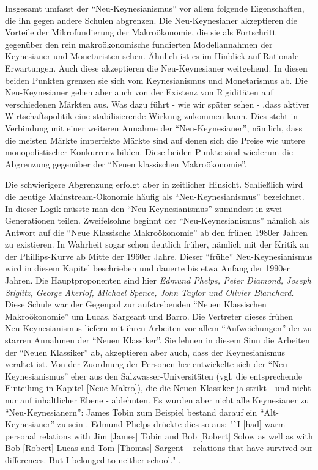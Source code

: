 Insgesamt umfasst der "`Neu-Keynesianismus"' vor allem folgende Eigenschaften, die ihn gegen andere Schulen abgrenzen. Die Neu-Keynesianer akzeptieren die Vorteile der Mikrofundierung der Makroökonomie, die sie als Fortschritt gegenüber den rein makroökonomische fundierten Modellannahmen der Keynesianer und Monetaristen sehen. Ähnlich ist es im Hinblick auf Rationale Erwartungen. Auch diese akzeptieren die Neu-Keynesianer weitgehend. In diesen beiden Punkten grenzen sie sich vom Keynesianismus und Monetarismus ab. Die Neu-Keynesianer gehen aber auch von der Existenz von Rigiditäten auf verschiedenen Märkten aus. Was dazu führt - wie wir später sehen - ,dass aktiver Wirtschaftspolitik eine stabilisierende Wirkung zukommen kann. Dies steht in Verbindung mit einer weiteren Annahme der "`Neu-Keynesianer"', nämlich, dass die meisten Märkte imperfekte Märkte sind auf denen sich die Preise wie untere monopolistischer Konkurrenz bilden. Diese beiden Punkte sind wiederum die Abgrenzung gegenüber der "`Neuen klassischen Makroökonomie"'. 

Die schwierigere Abgrenzung erfolgt aber in zeitlicher Hinsicht. Schließlich wird die heutige Mainstream-Ökonomie häufig als "`Neu-Keynesianismus"' bezeichnet. In dieser Logik müsste man den "`Neu-Keynesianismus"' zumindest in zwei Generationen teilen. Zweifelsohne beginnt der "`Neu-Keynesianismus"' nämlich als Antwort auf die "`Neue Klassische Makroökonomie"' ab den frühen 1980er Jahren zu existieren. In Wahrheit sogar schon deutlich früher, nämlich mit der Kritik an der Phillips-Kurve ab Mitte der 1960er Jahre. Dieser "`frühe"' Neu-Keynesianismus wird in diesem Kapitel beschrieben und dauerte bis etwa Anfang der 1990er Jahren. Die Hauptproponenten sind hier \textit{Edmund Phelps, Peter Diamond, Joseph Stiglitz, George Akerlof, Michael Spence, John Taylor und Olivier Blanchard}. Diese Schule war der Gegenpol zur aufstrebenden "`Neuen Klassischen Makroökonomie"' um Lucas, Sargeant und Barro. Die Vertreter dieses frühen Neu-Keynesianismus liefern mit ihren Arbeiten vor allem "`Aufweichungen"' der zu starren Annahmen der "`Neuen Klassiker"'. Sie lehnen in diesem Sinn die Arbeiten der "`Neuen Klassiker"' ab, akzeptieren aber auch, dass der Keynesianismus veraltet ist. Von der Zuordnung der Personen her entwickelte sich der "`Neu-Keynesianismus"' eher aus den Salzwasser-Universitäten (vgl. die entsprechende Einteilung in Kapitel \ref{Neue Makro}), die die Neuen Klassiker ja strikt - und nicht nur auf inhaltlicher Ebene - ablehnten. Es wurden aber nicht alle Keynesianer zu "`Neu-Keynesianern"': James Tobin zum Beispiel bestand darauf ein "`Alt-Keynesianer"' zu sein \parencite[S. 45ff]{Tobin1993}. Edmund Phelps drückte dies so aus: "`I [had] warm personal relations with Jim [James] Tobin and Bob [Robert] Solow as well as with Bob [Robert] Lucas and Tom [Thomas] Sargent – relations that have survived our differences. But I belonged to neither school." \parencite{Phelps2006}.

